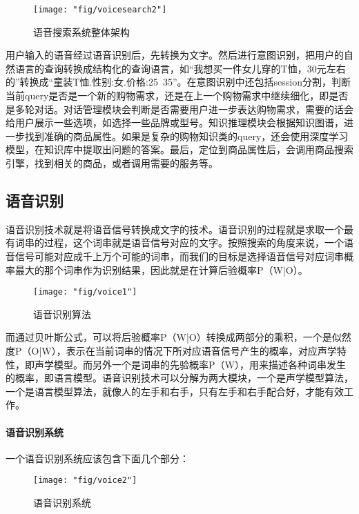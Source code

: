	\begin{figure}[h]
		\centering
		\texttt{[image: "fig/voicesearch2"]}
		\caption{语音搜索系统整体架构}
		\label{fig:voicesearch2}
	\end{figure}

用户输入的语音经过语音识别后，先转换为文字。然后进行意图识别，把用户的自然语言的查询转换成结构化的查询语言，如“我想买一件女儿穿的T恤，30元左右的”转换成“童装T恤.性别:女.价格:25~35”。在意图识别中还包括session分割，判断当前query是否是一个新的购物需求，还是在上一个购物需求中继续细化，即是否是多轮对话。对话管理模块会判断是否需要用户进一步表达购物需求，需要的话会给用户展示一些选项，如选择一些品牌或型号。知识推理模块会根据知识图谱，进一步找到准确的商品属性。如果是复杂的购物知识类的query，还会使用深度学习模型，在知识库中提取出问题的答案。最后，定位到商品属性后，会调用商品搜索引擎，找到相关的商品，或者调用需要的服务等。

\subsection{语音识别}

语音识别技术就是将语音信号转换成文字的技术。语音识别的过程就是求取一个最有词串的过程，这个词串就是语音信号对应的文字。按照搜索的角度来说，一个语音信号可能对应成千上万个可能的词串，而我们的目标是选择语音信号对应词串概率最大的那个词串作为识别结果，因此就是在计算后验概率P（W|O）。

\begin{figure}[h]
	\centering
	\texttt{[image: "fig/voice1"]}
	\caption{语音识别算法}
	\label{fig:voice1}
\end{figure}

而通过贝叶斯公式，可以将后验概率P（W|O）转换成两部分的乘积，一个是似然度P（O|W），表示在当前词串的情况下所对应语音信号产生的概率，对应声学特性，即声学模型。而另外一个是词串的先验概率P（W），用来描述各种词串发生的概率，即语言模型。语音识别技术可以分解为两大模块，一个是声学模型算法，一个是语言模型算法，就像人的左手和右手，只有左手和右手配合好，才能有效工作。

\paragraph{语音识别系统}

一个语音识别系统应该包含下面几个部分：

\begin{figure}[h]
	\centering
	\texttt{[image: "fig/voice2"]}
	\caption{语音识别系统}
	\label{fig:voice2}
\end{figure}

